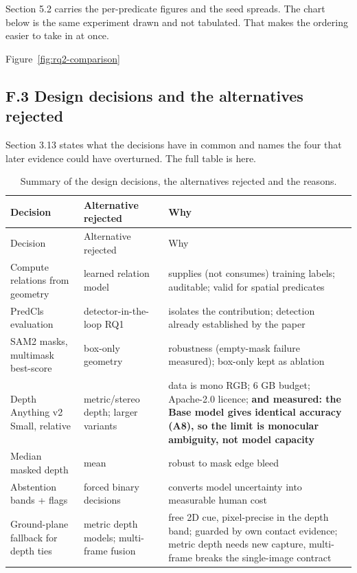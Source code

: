 Section 5.2 carries the per-predicate figures and the seed spreads. The chart below is the same experiment drawn and not tabulated. That makes the ordering easier to take in at once.

Figure~\ref{fig:rq2-comparison}

\subsection{F.3 Design decisions and the alternatives rejected}

Section 3.13 states what the decisions have in common and names the four that later evidence could have overturned. The full table is here.

\begin{center}
\setlength{\tabcolsep}{3pt}
\footnotesize
\begin{longtable}{>{\raggedright\arraybackslash}p{}>{\raggedright\arraybackslash}p{}>{\raggedright\arraybackslash}p{}}
\caption[Summary of the design decisions, the alternatives rejected]{Summary of the design decisions, the alternatives rejected and the reasons.}\\
\hline
Decision & Alternative rejected & Why \\
\hline
\endfirsthead
\hline
Decision & Alternative rejected & Why \\
\hline
\endhead
Compute relations from geometry & learned relation model & supplies (not consumes) training labels; auditable; valid for spatial predicates \\
PredCls evaluation & detector-in-the-loop RQ1 & isolates the contribution; detection already established by the paper \\
SAM2 masks, multimask best-score & box-only geometry & robustness (empty-mask failure measured); box-only kept as ablation \\
Depth Anything v2 Small, relative & metric/stereo depth; larger variants & data is mono RGB; 6 GB budget; Apache-2.0 licence; \textbf{and measured: the Base model gives identical accuracy (A8), so the limit is monocular ambiguity, not model capacity} \\
Median masked depth & mean & robust to mask edge bleed \\
Abstention bands + flags & forced binary decisions & converts model uncertainty into measurable human cost \\
Ground-plane fallback for depth ties & metric depth models; multi-frame fusion & free 2D cue, pixel-precise in the depth band; guarded by own contact evidence; metric depth needs new capture, multi-frame breaks the single-image contract \\

\end{longtable}
\end{center}
